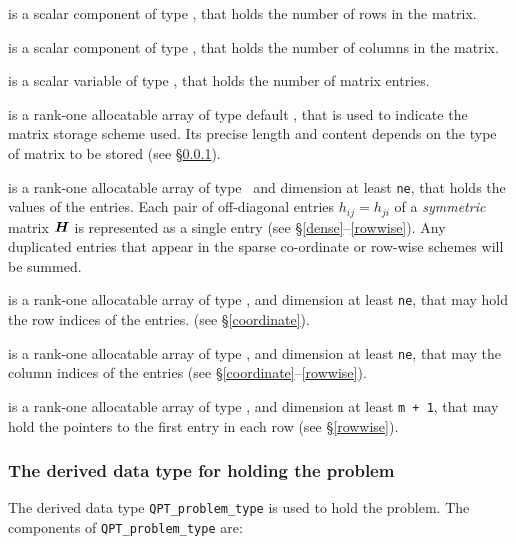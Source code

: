 \documentclass{galahad}
\begin{document}
\begin{description}

 is a scalar component of type \integer, 
that holds the number of rows in the matrix. 
 
 is a scalar component of type \integer, 
that holds the number of columns in the matrix. 
 
 is a scalar variable of type \integer, that
holds the number of matrix entries.

 is a rank-one allocatable array of type default \character, that
is used to indicate the matrix storage scheme used. Its precise length and
content depends on the type of matrix to be stored (see \S\ref{typeprob}).

 is a rank-one allocatable array of type \realdp\, 
and dimension at least {\tt ne}, that holds the values of the entries. 
Each pair of off-diagonal entries $h_{ij} = h_{ji}$ of a {\em symmetric}
matrix ${\bm{H}}$ is represented as a single entry 
(see \S\ref{dense}--\ref{rowwise}).
Any duplicated entries that appear in the sparse 
co-ordinate or row-wise schemes will be summed. 

 is a rank-one allocatable array of type \integer, 
and dimension at least {\tt ne}, that may hold the row indices of the entries. 
(see \S\ref{coordinate}).

 is a rank-one allocatable array of type \integer, 
and dimension at least {\tt ne}, that may the column indices of the entries
(see \S\ref{coordinate}--\ref{rowwise}).

 is a rank-one allocatable array of type \integer, 
and dimension at least {\tt m + 1}, that may hold the pointers to
the first entry in each row (see \S\ref{rowwise}).

\end{description}


\subsubsection{The derived data type for holding the problem}\label{typeprob}
The derived data type {\tt QPT\_problem\_type} is used to hold 
the problem. The components of 
{\tt QPT\_problem\_type} 
are:
\end{document}

